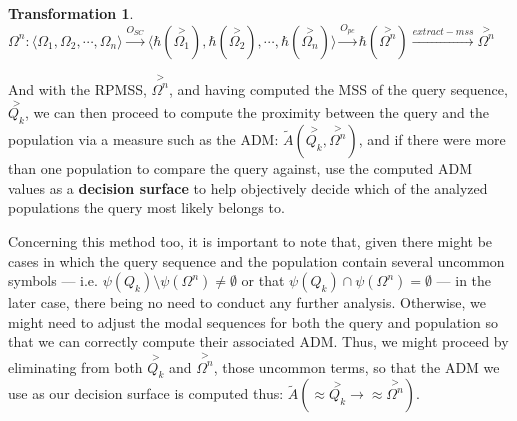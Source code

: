 \documentclass[a4paper, 18pt]{book} %
\newtheorem{trans}{Transformation}
\begin{document}
\vspace{1em}
\begin{trans}
\label{RPMSSFROMSCs}
$\Omega^n:\langle \Omega_1, \Omega_2, \cdots, \Omega_n \rangle \xrightarrow{O_{SC}}  \langle \hbar(\overset{>}{\Omega_1}), \hbar(\overset{>}{\Omega_2}), \cdots , \hbar(\overset{>}{\Omega_n}) \rangle \xrightarrow{O_{pc}} \hbar(\overset{>}{\Omega^n}) \xrightarrow{extract-mss} \overset{>}{\Omega^n}$
\end{trans}
\vspace{1em}


And with the RPMSS, $\overset{>}{\Omega^n}$, and having computed the MSS of the query sequence, $\overset{>}{Q_k}$, we can then proceed to compute the proximity between the query and the population via a measure such as the ADM: $\tilde{A}(\overset{>}{Q_k},\overset{>}{\Omega^n})$, and if there were more than one population to compare the query against, use the computed ADM values as a \textbf{decision surface} to help objectively decide which of the analyzed populations the query most likely belongs to.

Concerning this method too, it is important to note that, given there might be cases in which the query sequence and the population contain several uncommon symbols --- i.e. $\psi(Q_k) \setminus \psi(\Omega^n) \neq \emptyset$ or that $\psi(Q_k) \cap \psi(\Omega^n) = \emptyset$ --- in the later case, there being no need to conduct any further analysis. Otherwise, we might need to adjust the modal sequences for both the query and population so that we can correctly compute their associated ADM. Thus, we might proceed by eliminating from both $\overset{>}{Q_k}$ and $\overset{>}{\Omega^n}$, those uncommon terms, so that the ADM we use as our decision surface is computed thus: $\tilde{A}(\approx\overset{>}{Q_k} \rightarrow \approx\overset{>}{\Omega^n})$.\\
\end{document}
